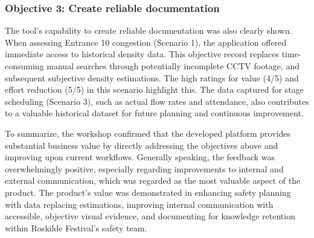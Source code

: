 \subsubsection{Objective 3: Create reliable documentation}

The tool's capability to create reliable documentation was also clearly shown. When assessing Entrance 10 congestion (Scenario 1), the application offered immediate access to historical density data. This objective record replaces time-consuming manual searches through potentially incomplete CCTV footage, and subsequent subjective density estimations. The high ratings for value (4/5) and effort reduction (5/5) in this scenario highlight this. The data captured for stage scheduling (Scenario 3), such as actual flow rates and attendance, also contributes to a valuable historical dataset for future planning and continuous improvement.

To summarize, the workshop confirmed that the developed platform provides substantial business value by directly addressing the objectives above and improving upon current workflows. Generally speaking, the feedback was overwhelmingly positive, especially regarding improvements to internal and external communication, which was regarded as the most valuable aspect of the product. The product's value was demonstrated in enhancing safety planning with data replacing estimations, improving internal communication with accessible, objective visual evidence, and documenting for knowledge retention within Roskilde Festival's safety team.
